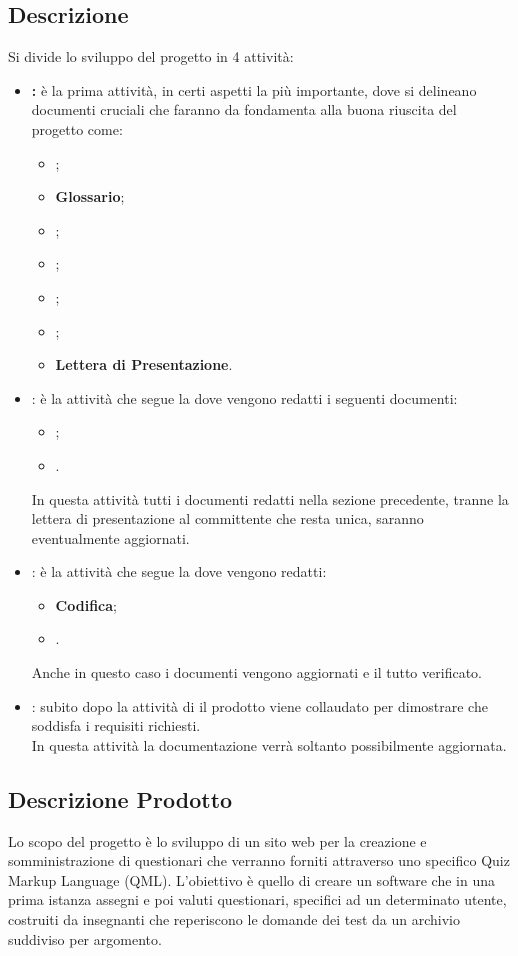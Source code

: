 \documentclass[12pt,a4paper]{article}
\begin{document}
\subsection{Descrizione}

Si divide lo sviluppo del progetto in 4 attività:
\begin{itemize}
	\item \textbf{\FA:} è la prima attività, in certi aspetti la più importante, dove si delineano documenti cruciali che faranno da fondamenta alla buona riuscita del progetto come:
	\begin{itemize}
		\item \textbf{\NdP};
		\item \textbf{Glossario};
		\item \textbf{\SdF};
		\item \textbf{\AdR};
		\item \textbf{\PdP};
		\item \textbf{\PdQ};
		\item \textbf{Lettera di Presentazione}.
	\end{itemize}
	\item \textbf{\FPA}: è la attività che segue la \textbf{\RR} dove vengono redatti i seguenti documenti:
	\begin{itemize}
		\item \textbf{\ST};
        \item \textbf{\DP}.
	\end{itemize} 
	In questa attività tutti i documenti redatti nella sezione precedente, tranne la lettera di presentazione al committente che resta unica, saranno eventualmente aggiornati.
	\item \textbf{\FPDC}: è la attività che segue la \textbf{\RP} dove vengono redatti:
	\begin{itemize}
		\item \textbf{Codifica};
		\item \textbf{\MU}.
	\end{itemize}
	Anche in questo caso i documenti vengono aggiornati e il tutto verificato.
	\item \textbf{\FVV}: subito dopo la attività di \textbf{\RQ} il prodotto viene collaudato per dimostrare che soddisfa i requisiti richiesti.
	\\In questa attività la documentazione verrà soltanto possibilmente aggiornata.
\end{itemize}

\subsection{Descrizione Prodotto}
Lo scopo del progetto è lo sviluppo di un sito web per la creazione e somministrazione di questionari che verranno forniti attraverso uno specifico Quiz Markup Language (QML). L'obiettivo è quello di creare un software che in una prima istanza assegni e poi valuti questionari, specifici ad un determinato utente, costruiti da insegnanti che reperiscono le domande dei test da un archivio suddiviso per argomento.
\end{document}
